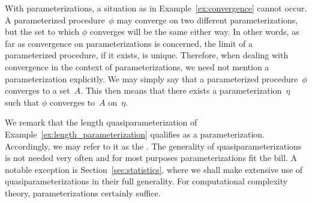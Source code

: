 With parameterizations, a situation as in Example~\ref{ex:convergence} cannot occur.
A parameterized procedure~$\phi$ may converge on two different parameterizations, but the set to which $\phi$ converges will be the same either way.
In other words, as far as convergence on parameterizations is concerned, the limit of a parameterized procedure, if it exists, is unique.
Therefore, when dealing with convergence in the context of parameterizations, we need not mention a parameterization explicitly.
We may simply say that a parameterized procedure~$\phi$ converges to a set~$A$.
This then means that there exists a parameterization~$\eta$ such that $\phi$ converges to~$A$ on~$\eta$.

We remark that the length quasiparameterization of Example~\ref{ex:length_parameterization} qualifies as a parameterization.
Accordingly, we may refer to it as the .
The generality of quasiparameterizations is not needed very often and for most purposes parameterizations fit the bill.
A notable exception is Section~\ref{sec:statistics}, where we shall make extensive use of quasiparameterizations in their full generality.
For computational complexity theory, parameterizations certainly suffice.
